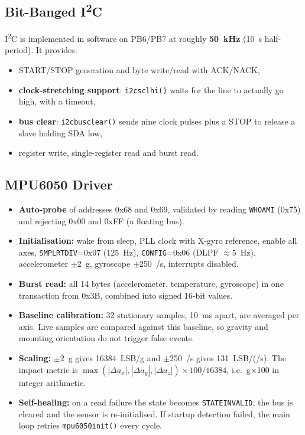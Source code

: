 \documentclass[11pt,a4paper]{article}
\newcommand{\us}{\textmu s}
\newcommand{\ttu}{\textunderscore}
\begin{document}
\subsection{Bit-Banged I\textsuperscript{2}C}
I\textsuperscript{2}C is implemented in software on PB6/PB7 at roughly \textbf{50~kHz} (10~\us{} half-period). It provides:
\begin{itemize}
  \item START/STOP generation and byte write/read with ACK/NACK,
  \item \textbf{clock-stretching support}: \texttt{i2c\ttu scl\ttu hi()} waits for the line to actually go high, with a timeout,
  \item \textbf{bus clear}: \texttt{i2c\ttu bus\ttu clear()} sends nine clock pulses plus a STOP to release a slave holding SDA low,
  \item register write, single-register read and burst read.
\end{itemize}

\subsection{MPU6050 Driver}
\begin{itemize}
  \item \textbf{Auto-probe} of addresses 0x68 and 0x69, validated by reading \texttt{WHO\ttu AM\ttu I} (0x75) and rejecting 0x00 and 0xFF (a floating bus).
  \item \textbf{Initialisation:} wake from sleep, PLL clock with X-gyro reference, enable all axes, \texttt{SMPLRT\ttu DIV}=0x07 (125~Hz), \texttt{CONFIG}=0x06 (DLPF $\approx$5~Hz), accelerometer $\pm$2~g, gyroscope $\pm$250~\textdegree/s, interrupts disabled.
  \item \textbf{Burst read:} all 14 bytes (accelerometer, temperature, gyroscope) in one transaction from 0x3B, combined into signed 16-bit values.
  \item \textbf{Baseline calibration:} 32 stationary samples, 10~ms apart, are averaged per axis. Live samples are compared against this baseline, so gravity and mounting orientation do not trigger false events.
  \item \textbf{Scaling:} $\pm$2~g gives 16384~LSB/g and $\pm$250~\textdegree/s gives 131~LSB/(\textdegree/s). The impact metric is $\max(|\Delta a_x|,|\Delta a_y|,|\Delta a_z|)\times 100/16384$, i.e.\ g$\times$100 in integer arithmetic.
  \item \textbf{Self-healing:} on a read failure the state becomes \texttt{STATE\ttu INVALID}, the bus is cleared and the sensor is re-initialised. If startup detection failed, the main loop retries \texttt{mpu6050\ttu init()} every cycle.
\end{itemize}
\end{document}
